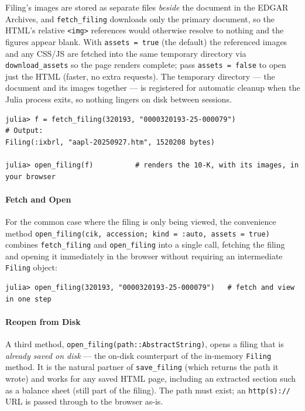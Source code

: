 \documentclass[11pt,a4paper]{report}
\begin{document}
Filing's images are stored as separate files \emph{beside} the document in the
EDGAR Archives, and \texttt{fetch\_filing} downloads only the primary document, so the
HTML's relative \texttt{<img>} references would otherwise resolve to nothing and the
figures appear blank. With \texttt{assets = true} (the default) the referenced images and any CSS/JS are fetched into the same temporary directory via
\texttt{download\_assets} so the page renders complete; pass \texttt{assets = false} to
open just the HTML (faster, no extra requests). The temporary directory --- the
document and its images together --- is registered for automatic cleanup when the
Julia process exits, so nothing lingers on disk between sessions.

\begin{lstlisting}
julia> f = fetch_filing(320193, "0000320193-25-000079")
# Output:
Filing(:ixbrl, "aapl-20250927.htm", 1520208 bytes)

julia> open_filing(f)          # renders the 10-K, with its images, in your browser
\end{lstlisting}

\paragraph{Fetch and Open} For the common case where the filing is only being viewed, the convenience method
\texttt{open\_filing(cik, accession; kind = :auto, assets = true)} combines \texttt{fetch\_filing} and \texttt{open\_filing} into a single call, fetching the
filing and opening it immediately in the browser without requiring an intermediate
\texttt{Filing} object:

\begin{lstlisting}
julia> open_filing(320193, "0000320193-25-000079")   # fetch and view in one step
\end{lstlisting}

\paragraph{Reopen from Disk} A third method, \texttt{open\_filing(path::AbstractString)},
opens a filing that is \emph{already saved on disk} --- the on-disk counterpart of the
in-memory \texttt{Filing} method. It is the natural partner of \texttt{save\_filing}
(which returns the path it wrote) and works for any saved HTML page, including an
extracted section such as a balance sheet (still part of the filing). The path must
exist; an \texttt{http(s)://} URL is passed through to the browser as-is.
\end{document}
